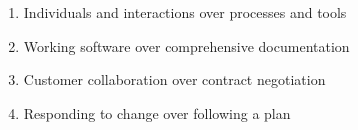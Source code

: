 
\begin{enumerate}
    \item  Individuals and interactions over processes and tools
    \item Working software over comprehensive documentation
    \item Customer collaboration over contract negotiation
    \item Responding to change over following a plan 
\end{enumerate}

